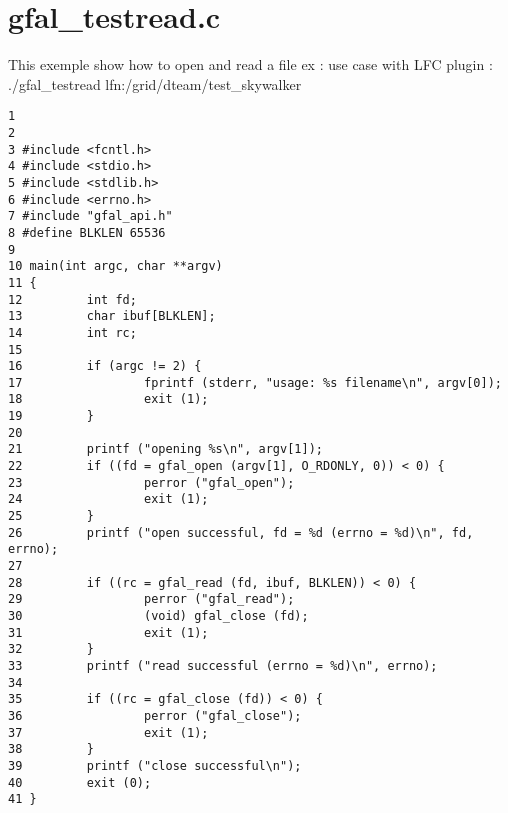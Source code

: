 \section{gfal\_\-testread.c}
This exemple show how to open and read a file ex : use case with LFC plugin : ./gfal\_\-testread lfn:/grid/dteam/test\_\-skywalker



\begin{DocInclude}\begin{verbatim}1 
2 
3 #include <fcntl.h>
4 #include <stdio.h>
5 #include <stdlib.h>
6 #include <errno.h>
7 #include "gfal_api.h"
8 #define BLKLEN 65536
9 
10 main(int argc, char **argv)
11 {
12         int fd;
13         char ibuf[BLKLEN];
14         int rc;
15 
16         if (argc != 2) {
17                 fprintf (stderr, "usage: %s filename\n", argv[0]);
18                 exit (1);
19         }
20 
21         printf ("opening %s\n", argv[1]);
22         if ((fd = gfal_open (argv[1], O_RDONLY, 0)) < 0) {
23                 perror ("gfal_open");
24                 exit (1);
25         }
26         printf ("open successful, fd = %d (errno = %d)\n", fd, errno);
27 
28         if ((rc = gfal_read (fd, ibuf, BLKLEN)) < 0) {
29                 perror ("gfal_read");
30                 (void) gfal_close (fd);
31                 exit (1);
32         }
33         printf ("read successful (errno = %d)\n", errno);
34 
35         if ((rc = gfal_close (fd)) < 0) {
36                 perror ("gfal_close");
37                 exit (1);
38         }
39         printf ("close successful\n");
40         exit (0);
41 }
\end{verbatim}
\end{DocInclude}
 